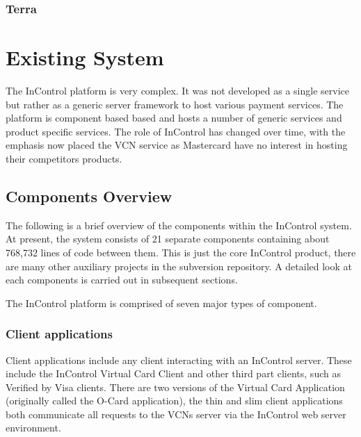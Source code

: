 \documentclass[a4paper, 11pt, titlepage]{article}
\begin{document}
\subsubsection{Terra}
\label{Terra}

\section{Existing System}

The InControl platform is very complex. It was not developed as a single service but rather as a generic server framework to host various payment services. The platform is component based based and hosts a number of generic services and product specific services. The role of InControl has changed over time, with the emphasis now placed the VCN service as Mastercard have no interest in hosting their competitors products.

\subsection{Components Overview}
The following is a brief overview of the components within the InControl system. At present, the system consists of 21 separate components containing about 768,732 lines of code between them.\cite{SLOC} This is just the core InControl product, there are many other auxiliary projects in the subversion repository. A detailed look at each components is carried out in subsequent sections.

The InControl platform is comprised of seven major types of component.
\subsubsection{Client applications}
Client applications include any client interacting with an InControl server. These include the InControl Virtual Card Client and other third part clients, such as Verified by Visa clients. There are two versions of the Virtual Card Application (originally called the O-Card application), the thin and slim client applications both communicate all requests to the VCNs server via the InControl web server environment.
\end{document}
